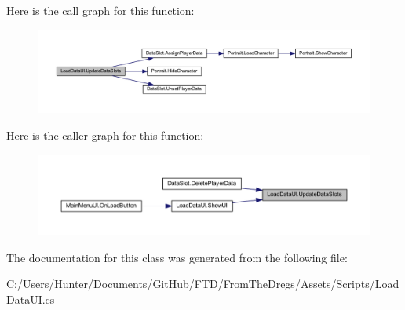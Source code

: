 Here is the call graph for this function\+:
\nopagebreak
\begin{figure}[H]
\begin{center}
\leavevmode
\includegraphics[width=350pt]{class_load_data_u_i_a2a36a17c6455a8ca8ee3b92dbbce0503_cgraph}
\end{center}
\end{figure}
Here is the caller graph for this function\+:
\nopagebreak
\begin{figure}[H]
\begin{center}
\leavevmode
\includegraphics[width=350pt]{class_load_data_u_i_a2a36a17c6455a8ca8ee3b92dbbce0503_icgraph}
\end{center}
\end{figure}


The documentation for this class was generated from the following file\+:\begin{DoxyCompactItemize}
\item 
C\+:/\+Users/\+Hunter/\+Documents/\+Git\+Hub/\+F\+T\+D/\+From\+The\+Dregs/\+Assets/\+Scripts/Load\+Data\+U\+I.\+cs\end{DoxyCompactItemize}
